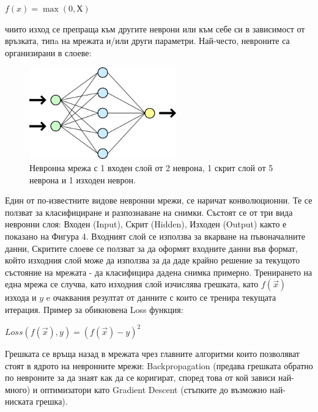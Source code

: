 \begin{center}
$f(x)=\max(0,Х)$
\end{center}

чиито изход се препраща към другите неврони или към себе си в зависимост от връзката, типa на мрежата и/или други параметри. Най-често, невроните са организирани в слоеве:

\begin{center}
\begin{figure}[h]
    \centering
    \includegraphics[width=180pt]{network1.png}
    \caption{Невронна мрежа с 1 входен слой от 2 неврона, 1 скрит слой от 5 неврона и 1 изходен неврон.}
    \label{fig:mesh1}
\end{figure}
\end{center}

Един от по-известните видове невронни мрежи, се наричат конволюционни. Те се ползват за класифициране и разпознаване на снимки. Състоят се от три вида невронни слоя: Входен (Input), Скрит (Hidden), Изходен (Output) както е показано на Фигура 4. Входният слой се използва за вкарване на пъвоначалните данни, Скритите слоеве се ползват за да оформят входните данни във формат, който изходния слой може да използва за да даде крайно решение за текущото състояние на мрежата - да класифицира дадена снимка примерно. Тренирането на една мрежа се случва, като изходния слой изчислява грешката, като $f({\vec {x}})$ изхода и $y$ e очаквания резултат от данните с които се тренира текущата итерация. Пример за обикновена Loss функция:

\begin{center}
$Loss(f({\vec {x}}),y)=(f({\vec {x}}) - y)^{2}$
\end{center}

Грешката се връща назад в мрежата чрез главните алгоритми които позволяват стоят в ядрото на невронните мрежи: Backpropagation (предава грешката обратно по невроните за да знаят как да се коригират, според това от кой зависи най-много) и оптимизатори като Gradient Descent (стъпките до възможно най-ниската грешка).


